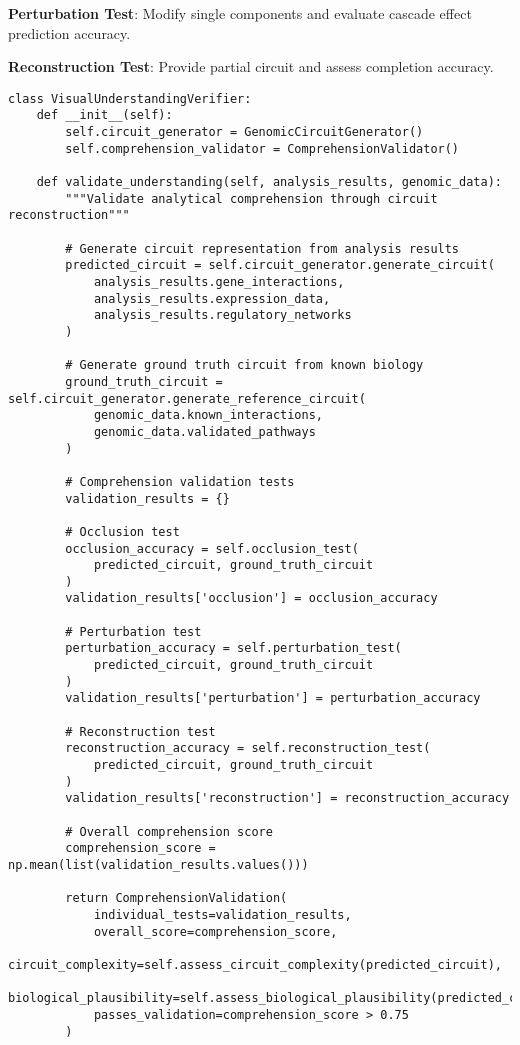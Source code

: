 \documentclass[12pt,a4paper]{article}
\begin{document}
\textbf{Perturbation Test}: Modify single components and evaluate cascade effect prediction accuracy.

\textbf{Reconstruction Test}: Provide partial circuit and assess completion accuracy.

\begin{lstlisting}[style=pythonstyle, caption=Visual Understanding Verification Implementation]
class VisualUnderstandingVerifier:
    def __init__(self):
        self.circuit_generator = GenomicCircuitGenerator()
        self.comprehension_validator = ComprehensionValidator()
        
    def validate_understanding(self, analysis_results, genomic_data):
        """Validate analytical comprehension through circuit reconstruction"""
        
        # Generate circuit representation from analysis results
        predicted_circuit = self.circuit_generator.generate_circuit(
            analysis_results.gene_interactions,
            analysis_results.expression_data,
            analysis_results.regulatory_networks
        )
        
        # Generate ground truth circuit from known biology
        ground_truth_circuit = self.circuit_generator.generate_reference_circuit(
            genomic_data.known_interactions,
            genomic_data.validated_pathways
        )
        
        # Comprehension validation tests
        validation_results = {}
        
        # Occlusion test
        occlusion_accuracy = self.occlusion_test(
            predicted_circuit, ground_truth_circuit
        )
        validation_results['occlusion'] = occlusion_accuracy
        
        # Perturbation test  
        perturbation_accuracy = self.perturbation_test(
            predicted_circuit, ground_truth_circuit
        )
        validation_results['perturbation'] = perturbation_accuracy
        
        # Reconstruction test
        reconstruction_accuracy = self.reconstruction_test(
            predicted_circuit, ground_truth_circuit
        )
        validation_results['reconstruction'] = reconstruction_accuracy
        
        # Overall comprehension score
        comprehension_score = np.mean(list(validation_results.values()))
        
        return ComprehensionValidation(
            individual_tests=validation_results,
            overall_score=comprehension_score,
            circuit_complexity=self.assess_circuit_complexity(predicted_circuit),
            biological_plausibility=self.assess_biological_plausibility(predicted_circuit),
            passes_validation=comprehension_score > 0.75
        )
        

\end{lstlisting}
\end{document}
